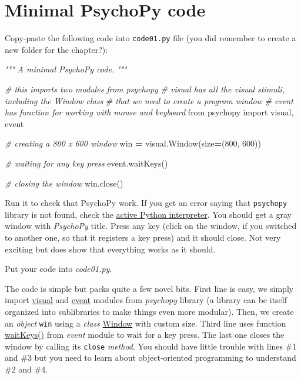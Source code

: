 \documentclass[
]{book}
\newenvironment{Shaded}{\begin{snugshade}}{\end{snugshade}}
\newcommand{\CommentTok}[1]{\textcolor[rgb]{0.56,0.35,0.01}{\textit{#1}}}
\newcommand{\DecValTok}[1]{\textcolor[rgb]{0.00,0.00,0.81}{#1}}
\newcommand{\ImportTok}[1]{#1}
\newcommand{\NormalTok}[1]{#1}
\newcommand{\OperatorTok}[1]{\textcolor[rgb]{0.81,0.36,0.00}{\textbf{#1}}}
\begin{document}
\hypertarget{minimal-psychopy}{%
\section{Minimal PsychoPy code}\label{minimal-psychopy}}

Copy-paste the following code into \texttt{code01.py} file (you did remember to create a new folder for the chapter?):

\begin{Shaded}
\begin{Highlighting}[]
\CommentTok{"""}
\CommentTok{A minimal PsychoPy code.}
\CommentTok{"""}

\CommentTok{\# this imports two modules from psychopy}
\CommentTok{\# visual has all the visual stimuli, including the Window class}
\CommentTok{\# that we need to create a program window}
\CommentTok{\# event has function for working with mouse and keyboard}
\ImportTok{from}\NormalTok{ psychopy }\ImportTok{import}\NormalTok{ visual, event}

\CommentTok{\# creating a 800 x 600 window}
\NormalTok{win }\OperatorTok{=}\NormalTok{ visual.Window(size}\OperatorTok{=}\NormalTok{(}\DecValTok{800}\NormalTok{, }\DecValTok{600}\NormalTok{))}

\CommentTok{\# waiting for any key press}
\NormalTok{event.waitKeys()}

\CommentTok{\# closing the window}
\NormalTok{win.close()}
\end{Highlighting}
\end{Shaded}

Run it to check that PsychoPy work. If you get an error saying that \texttt{psychopy} library is not found, check the \protect\hyperlink{install-vs-code}{active Python interpreter}. You should get a gray window with \emph{PsychoPy} title. Press any key (click on the window, if you switched to another one, so that it registers a key press) and it should close. Not very exciting but does show that everything works as it should.

Put your code into \emph{code01.py}.

The code is simple but packs quite a few novel bits. First line is easy, we simply import \href{https://psychopy.org/api/visual/index.html}{visual} and \href{https://psychopy.org/api/event.html}{event} modules from \emph{psychopy} library (a library can be itself organized into sublibraries to make things even more modular). Then, we create an \emph{object} \texttt{win} using a \emph{class} \href{https://psychopy.org/api/visual/window.html\#psychopy.visual.Window}{Window} with custom size. Third line uses function \href{https://psychopy.org/api/event.html\#psychopy.event.waitKeys}{waitKeys()} from \emph{event} module to wait for a key press. The last one closes the window by calling its \texttt{close} \emph{method}. You should have little trouble with lines \#1 and \#3 but you need to learn about object-oriented programming to understand \#2 and \#4.
\end{document}
